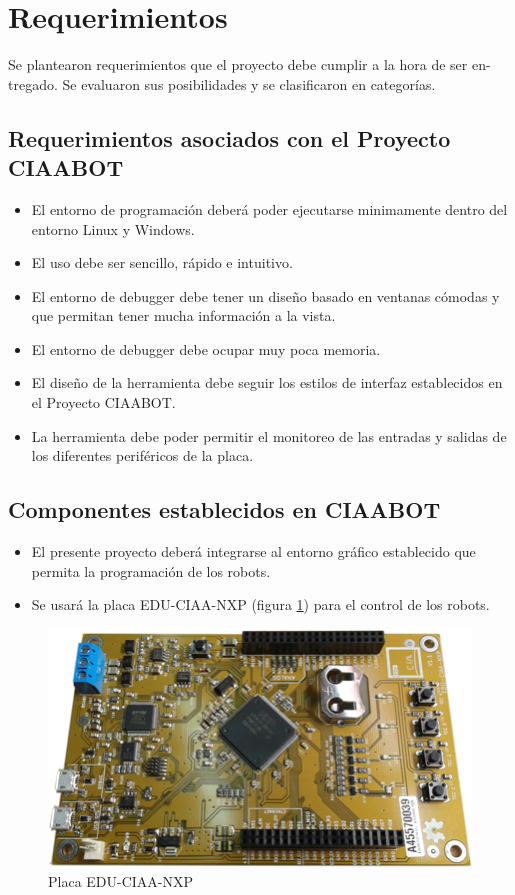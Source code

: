 \section{Requerimientos}
\label{sec:ejemplo}

Se plantearon requerimientos que el proyecto debe cumplir a la hora de ser en-
tregado. Se evaluaron sus posibilidades y se clasificaron en categorías.

\subsection{Requerimientos asociados con el Proyecto CIAABOT}

\begin{itemize}
	\item El entorno de programación deberá poder ejecutarse minimamente dentro del entorno Linux y Windows.	
	\item El uso debe ser sencillo, rápido e intuitivo.
	\item El entorno de debugger debe tener un diseño basado en ventanas cómodas y que permitan
	tener mucha información a la vista.
	\item El entorno de debugger debe ocupar muy poca memoria.
	\item El diseño de la herramienta debe seguir los estilos de interfaz establecidos en el Proyecto CIAABOT.
	\item La herramienta debe poder permitir el monitoreo de las entradas y salidas de los diferentes periféricos de la placa.	
\end{itemize}

\subsection{Componentes establecidos en CIAABOT}

\begin{itemize}
	\item El presente proyecto deberá integrarse al entorno gráfico establecido que permita la programación de los robots.	
	\item Se usará la placa EDU-CIAA-NXP (figura \ref{fig:edu-ciaa-nxp}) para el control de los robots.	
\end{itemize}

\begin{figure}[h]
	\centering
	\includegraphics[scale=.50]{./Figures/EDU-CIAA-NXP_Foto.png}
	\caption{Placa EDU-CIAA-NXP}
	\label{fig:edu-ciaa-nxp}
\end{figure}

